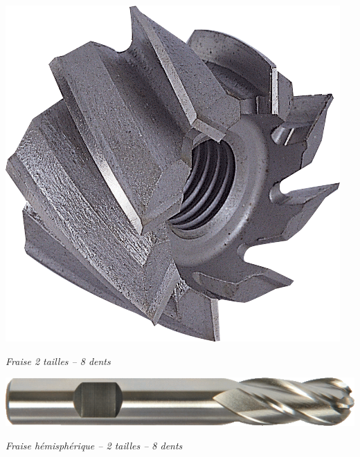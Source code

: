 \documentclass[11pt,oneside]{article}
\begin{document}
\begin{minipage}[c]{.3\linewidth}
\begin{center}
\includegraphics[width=.9\textwidth]{png/fr_2t}

\textit{Fraise 2 tailles -- 8 dents}
\end{center}
\end{minipage}\hfill
\begin{minipage}[c]{.3\linewidth}
\begin{center}
\includegraphics[width=.9\textwidth]{png/fr_hemisph}

\textit{Fraise hémisphérique -- 2 tailles -- 8 dents}
\end{center}
\end{minipage}\hfill
\end{document}
